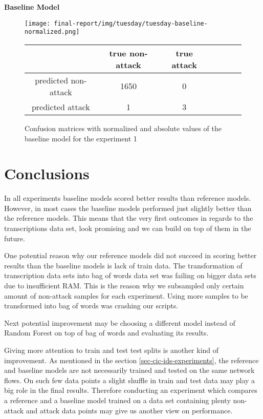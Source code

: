 \documentclass{article}
\begin{document}
\vspace{0.5cm}
\noindent\textbf{Baseline Model}

\begin{figure}[h!]
    \centering
    \texttt{[image: final-report/img/tuesday/tuesday-baseline-normalized.png]}

    \centering
    \begin{tabular}{ |c|c|c|c|c|c|c| }
     \hline
      & true non-attack & true attack \\
     \hline
     predicted non-attack & 1650 & 0 \\
     \hline
     predicted attack & 1 & 3 \\
     \hline
    \end{tabular}
    \caption{Confusion matrices with normalized and absolute values of the baseline model for the experiment 1}
    \label{fig-exp3-baseline}
\end{figure}




\clearpage
\section{Conclusions}
In all experiments baseline models scored better results than reference models. However, in most cases the baseline models performed just slightly better than the reference models. This means that the very first outcomes in regards to the transcriptions data set, look promising and we can build on top of them in the future.

One potential reason why our reference models did not succeed in scoring better results than the baseline models is lack of train data. The transformation of transcription data sets into bag of words data set was failing on bigger data sets due to insufficient RAM. This is the reason why we subsampled only certain amount of non-attack samples for each experiment. Using more samples to be transformed into bag of words was crashing our scripts.

Next potential improvement may be choosing a different model instead of Random Forest on top of bag of words and evaluating its results.

Giving more attention to train and test test splits is another kind of improvement. As mentioned in the section \ref{sec-cic-ids-experiments}, the reference and baseline models are not necessarily trained and tested on the same network flows. On such few data points a slight shuffle in train and test data may play a big role in the final results. Therefore conducting an experiment which compares a reference and a baseline model trained on a data set containing plenty non-attack and attack data points may give us another view on performance.
\end{document}
